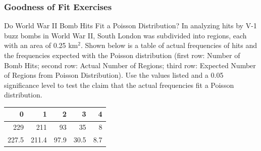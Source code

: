 \documentclass[xcolor=dvipsnames]{beamer}
\begin{document}
\begin{frame}
  \frametitle{Goodness of Fit Exercises}
  {\ubung} Do World War II Bomb Hits Fit a Poisson Distribution?
  In analyzing hits by V-1 buzz bombs in World War II, South
  London was subdivided into regions, each with an area of 0.25
  km$^{2}$. Shown below is a table of actual frequencies of hits
  and the frequencies expected with the Poisson distribution
  (first row: Number of Bomb Hits; second row: Actual Number of
  Regions; third row: Expected Number of Regions from Poisson
  Distribution). Use the values listed and a 0.05 significance
  level to test the claim that the actual frequencies fit a
  Poisson distribution.

  \medskip

\begin{tabular}{|r|r|r|r|r|}\hline
\textbf{0} & \textbf{1} & \textbf{2} & \textbf{3} & \textbf{4} \\ \hline
229        & 211        & 93         & 35         & 8          \\ \hline
227.5      & 211.4      & 97.9       & 30.5       & 8.7        \\ \hline
\end{tabular}
\end{frame}
\end{document}
